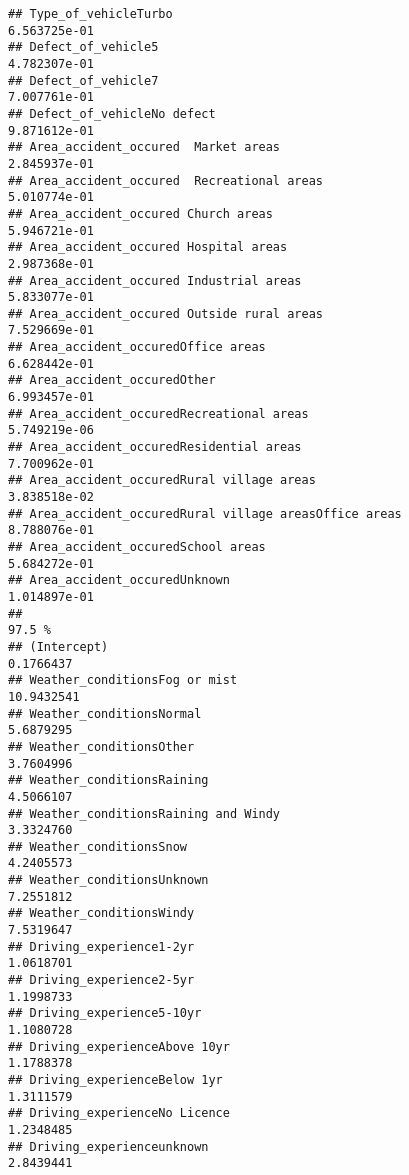 \documentclass[
]{article}
\begin{document}
\begin{verbatim}
## Type_of_vehicleTurbo                                         6.563725e-01
## Defect_of_vehicle5                                           4.782307e-01
## Defect_of_vehicle7                                           7.007761e-01
## Defect_of_vehicleNo defect                                   9.871612e-01
## Area_accident_occured  Market areas                          2.845937e-01
## Area_accident_occured  Recreational areas                    5.010774e-01
## Area_accident_occured Church areas                           5.946721e-01
## Area_accident_occured Hospital areas                         2.987368e-01
## Area_accident_occured Industrial areas                       5.833077e-01
## Area_accident_occured Outside rural areas                    7.529669e-01
## Area_accident_occuredOffice areas                            6.628442e-01
## Area_accident_occuredOther                                   6.993457e-01
## Area_accident_occuredRecreational areas                      5.749219e-06
## Area_accident_occuredResidential areas                       7.700962e-01
## Area_accident_occuredRural village areas                     3.838518e-02
## Area_accident_occuredRural village areasOffice areas         8.788076e-01
## Area_accident_occuredSchool areas                            5.684272e-01
## Area_accident_occuredUnknown                                 1.014897e-01
##                                                                  97.5 %
## (Intercept)                                                   0.1766437
## Weather_conditionsFog or mist                                10.9432541
## Weather_conditionsNormal                                      5.6879295
## Weather_conditionsOther                                       3.7604996
## Weather_conditionsRaining                                     4.5066107
## Weather_conditionsRaining and Windy                           3.3324760
## Weather_conditionsSnow                                        4.2405573
## Weather_conditionsUnknown                                     7.2551812
## Weather_conditionsWindy                                       7.5319647
## Driving_experience1-2yr                                       1.0618701
## Driving_experience2-5yr                                       1.1998733
## Driving_experience5-10yr                                      1.1080728
## Driving_experienceAbove 10yr                                  1.1788378
## Driving_experienceBelow 1yr                                   1.3111579
## Driving_experienceNo Licence                                  1.2348485
## Driving_experienceunknown                                     2.8439441

\end{verbatim}
\end{document}
